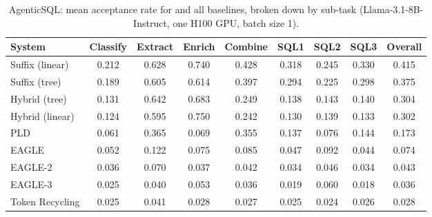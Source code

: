 \begin{table}[htbp]
\centering
\caption{AgenticSQL: mean acceptance rate for \SuffixDecoding and all baselines, broken down by sub-task (Llama-3.1-8B-Instruct, one H100 GPU, batch size 1).}
\label{suffixdecoding:tab:sql-rate}
\small
\begin{adjustbox}{width=\linewidth}
\begin{tabular}{lcccccccc}
\toprule
\textbf{System} & Classify & Extract & Enrich & Combine & SQL1 & SQL2 & SQL3 & \textbf{Overall} \\
\midrule
Suffix (linear) & 0.212 & 0.628 & 0.740 & 0.428 & 0.318 & 0.245 & 0.330 & 0.415 \\
Suffix (tree) & 0.189 & 0.605 & 0.614 & 0.397 & 0.294 & 0.225 & 0.298 & 0.375 \\
Hybrid (tree) & 0.131 & 0.642 & 0.683 & 0.249 & 0.138 & 0.143 & 0.140 & 0.304 \\
Hybrid (linear) & 0.124 & 0.595 & 0.750 & 0.242 & 0.130 & 0.139 & 0.133 & 0.302 \\
PLD & 0.061 & 0.365 & 0.069 & 0.355 & 0.137 & 0.076 & 0.144 & 0.173 \\
EAGLE & 0.052 & 0.122 & 0.075 & 0.085 & 0.047 & 0.092 & 0.044 & 0.074 \\
EAGLE-2 & 0.036 & 0.070 & 0.037 & 0.042 & 0.034 & 0.046 & 0.034 & 0.043 \\
EAGLE-3 & 0.025 & 0.040 & 0.053 & 0.036 & 0.019 & 0.060 & 0.018 & 0.036 \\
Token Recycling & 0.025 & 0.041 & 0.028 & 0.027 & 0.025 & 0.024 & 0.026 & 0.028 \\
\bottomrule
\end{tabular}
\end{adjustbox}
\end{table}

